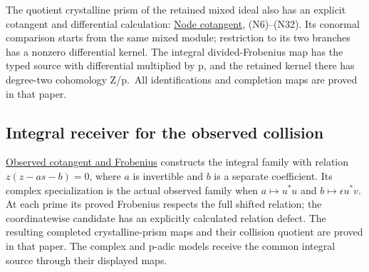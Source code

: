 \documentclass[
]{article}
\begin{document}
The quotient crystalline prism of the retained mixed ideal also has an
explicit cotangent and differential calculation:
\href{https://github.com/KokunoYumeto/zeta-function-research-reader/blob/6af54ea3c8ef99127af327f3103e086c68d482c2/workbenches/splitzero-tandem/branches/identity-absorber-square/NODE_COTANGENT.md}{Node
cotangent}, (N6)--(N32). Its conormal comparison starts from the same
mixed module; restriction to its two branches has a nonzero differential
kernel. The integral divided-Frobenius map has the typed source with
differential multiplied by p, and the retained kernel there has
degree-two cohomology Z/p.~All identifications and completion maps are
proved in that paper.

\subsection{Integral receiver for the observed
collision}\label{integral-receiver-for-the-observed-collision}

\href{https://github.com/KokunoYumeto/zeta-function-research-reader/blob/c9df443d9e1df000dfbb083943f97197e746eb08/workbenches/splitzero-tandem/branches/identity-absorber-square/OBSERVED_COTANGENT_FROBENIUS.md}{Observed
cotangent and Frobenius} constructs the integral family with relation
\(z(z-as-b)=0\), where \(a\) is invertible and \(b\) is a separate
coefficient. Its complex specialization is the actual observed family
when \(a\mapsto u^*u\) and \(b\mapsto\epsilon u^*v\). At each prime its
proved Frobenius respects the full shifted relation; the coordinatewise
candidate has an explicitly calculated relation defect. The resulting
completed crystalline-prism maps and their collision quotient are proved
in that paper. The complex and p-adic models receive the common integral
source through their displayed maps.
\end{document}
